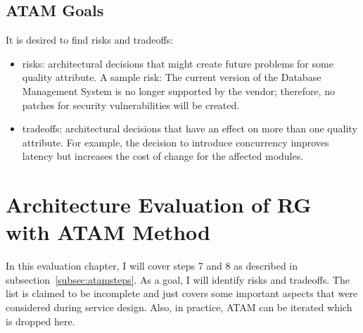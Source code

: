 \subsection{ATAM Goals}
\label{subsec:atamgoa}
It is desired to find risks and tradeoffs:
\begin{itemize}
    \item risks: architectural decisions that might create future problems for some quality attribute. A sample risk: The current version of the Database Management System is no longer supported by the vendor; therefore, no patches for security vulnerabilities will be created.
    \item tradeoffs: architectural decisions that have an effect on more than one quality attribute.     For example, the decision to introduce concurrency improves latency but increases the cost of change for the affected modules. 
\end{itemize}

\section{Architecture Evaluation of RG with ATAM Method}
In this evaluation chapter, I will cover steps 7 and 8 as described in subsection~\ref{subsec:atamsteps}. As a goal, I will identify risks and tradeoffs. The list is claimed to be incomplete and just covers some important aspects that were considered during service design. Also, in practice, ATAM can be iterated which is dropped here.

